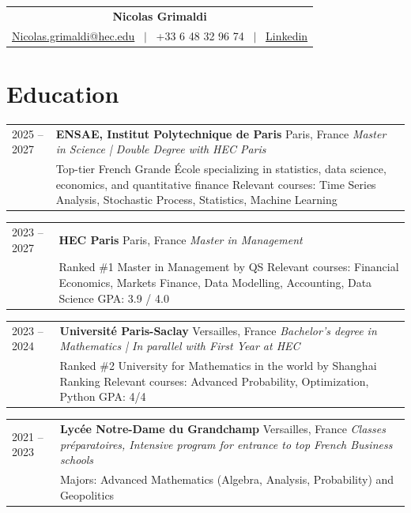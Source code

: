 \documentclass[11pt,a4paper]{article}
\makeatletter
\newlength{\datecolwidth}
\newcommand{\CVItem}[5]{%
    \noindent%
    \begin{tabularx}{\textwidth}{@{}p{\datecolwidth} X@{}}
        #1 & \textbf{#2} \hfill #3 \newline \textit{#4} \\ %
           & #5 
    \end{tabularx}%
    \vspace{2pt}%
}
\makeatother
\begin{document}
\begin{center}
    \begin{tabular}{c}
        {\huge \textbf{Nicolas Grimaldi}} \\[3pt]
        \href{mailto:Nicolas.grimaldi@hec.edu}{Nicolas.grimaldi@hec.edu} \ $|$ \ +33 6 48 32 96 74 \ $|$ \ \href{https://www.linkedin.com/in/nicolas-grimaldi-a893b6246/}{Linkedin}
    \end{tabular}
\end{center}

\vspace{-8pt}

\section{Education}

\CVItem{2025 -- 2027}
    {ENSAE, Institut Polytechnique de Paris}
    {Paris, France}
    {Master in Science | Double Degree with HEC Paris}
    {Top-tier French Grande École specializing in statistics, data science, economics, and quantitative finance \newline
     Relevant courses: Time Series Analysis, Stochastic Process, Statistics, Machine Learning}

\CVItem{2023 -- 2027}
    {HEC Paris}
    {Paris, France}
    {Master in Management}
    {Ranked \#1 Master in Management by QS \newline
     Relevant courses: Financial Economics, Markets Finance, Data Modelling, Accounting, Data Science \newline
     GPA: 3.9 / 4.0}

\CVItem{2023 -- 2024}
    {Université Paris-Saclay}
    {Versailles, France}
    {Bachelor’s degree in Mathematics | In parallel with First Year at HEC}
    {Ranked \#2 University for Mathematics in the world by Shanghai Ranking \newline
     Relevant courses: Advanced Probability, Optimization, Python \newline
     GPA: 4/4}

\CVItem{2021 -- 2023}
    {Lycée Notre-Dame du Grandchamp}
    {Versailles, France}
    {Classes préparatoires, Intensive program for entrance to top French Business schools}
    {Majors: Advanced Mathematics (Algebra, Analysis, Probability) and Geopolitics}

\end{document}
